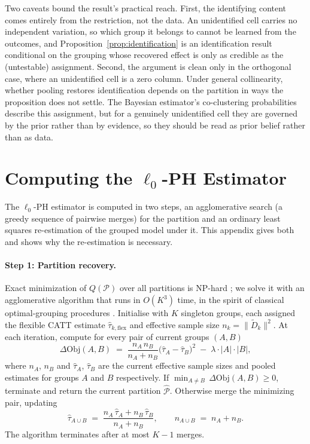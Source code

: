 \documentclass[margin=5in, 12pt]{article}
\newcommand{\1}{\mathbbm{1}}
\begin{document}
Two caveats bound the result's practical reach. First, the identifying content
comes entirely from the restriction, not the data. An unidentified cell carries
no independent variation, so which group it belongs to cannot be learned from the
outcomes, and Proposition~\ref{prop:identification} is an identification result
conditional on the grouping whose recovered effect is only as credible as the
(untestable) assignment. Second, the argument is clean only in the orthogonal
case, where an unidentified cell is a zero column. Under general collinearity,
whether pooling restores identification depends on the partition in ways the
proposition does not settle. The Bayesian estimator's co-clustering probabilities
describe this assignment, but for a genuinely unidentified cell they are governed
by the prior rather than by evidence, so they should be read as prior belief
rather than as data.

\section{Computing the $\ell_0$-PH Estimator}
\label{app:algorithm}

The $\ell_0$-PH estimator is computed in two steps, an agglomerative search (a greedy sequence of pairwise merges) for the partition and an ordinary least squares re-estimation of the grouped model under it. This appendix gives both and shows why the re-estimation is necessary.

  \paragraph{Step 1: Partition recovery.} Exact minimization of $Q(\mathcal{P})$ over all partitions is NP-hard \citep{fan2001}; we solve it with
  an agglomerative algorithm that runs in $O(K^3)$ time, in the spirit of classical optimal-grouping procedures \citep{fisher1958}. Initialise with $K$ singleton groups, each assigned the flexible
  CATT estimate $\hat{\tau}_{k,\mathrm{flex}}$ and effective sample size $n_k = \|\tilde{D}_k\|^2$. At each iteration, compute
  for every pair of current groups $(A, B)$
  \begin{equation}
    \Delta\mathrm{Obj}(A, B) \;=\; \frac{n_A\, n_B}{n_A + n_B}\bigl(\hat{\tau}_A - \hat{\tau}_B\bigr)^2 \;-\; \lambda \cdot |A|
  \cdot |B|,
    \label{eq:deltaobj}
  \end{equation}
  where $n_A$, $n_B$ and $\hat{\tau}_A$, $\hat{\tau}_B$ are the current effective sample sizes and pooled estimates for groups
  $A$ and $B$ respectively. If $\min_{A \neq B}\,\Delta\mathrm{Obj}(A,B) \geq 0$, terminate and return the current partition
  $\hat{\mathcal{P}}$. Otherwise merge the minimizing pair, updating
  \begin{equation}
    \hat{\tau}_{A \cup B} \;=\; \frac{n_A\,\hat{\tau}_A + n_B\,\hat{\tau}_B}{n_A + n_B}, \qquad n_{A \cup B} \;=\; n_A + n_B.
    \label{eq:pooled}
  \end{equation}
  The algorithm terminates after at most $K - 1$ merges.
\end{document}
